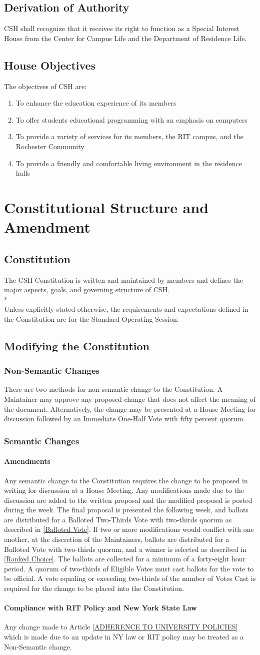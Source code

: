 \documentclass{article}
\newcommand{\article}[1]{\section{#1} \label{#1}}
\newcommand{\asection}[1]{\subsection{#1} \label{#1}}
\newcommand{\asubsection}[1]{\subsubsection{#1} \label{#1}}
\newcommand{\asubsubsection}[1]{\paragraph{#1} \label{#1}}
\begin{document}
\asection{Derivation of Authority}
CSH shall recognize that it receives its right to function as a Special Interest House from the Center for Campus Life and the Department of Residence Life.

\asection{House Objectives}
The objectives of CSH are:
\begin{enumerate}
	\item To enhance the education experience of its members
	\item To offer students educational programming with an emphasis on computers
	\item To provide a variety of services for its members, the RIT campus, and the Rochester Community
	\item To provide a friendly and comfortable living environment in the residence halls
\end{enumerate}

\article{Constitutional Structure and Amendment}

\asection{Constitution}
The CSH Constitution is written and maintained by members and defines the major aspects, goals, and governing structure of CSH.
\\*\\
Unless explicitly stated otherwise, the requirements and expectations defined in the Constitution are for the Standard Operating Session.

\asection{Modifying the Constitution}
\asubsection{Non-Semantic Changes}
There are two methods for non-semantic change to the Constitution.
A Maintainer may approve any proposed change that does not affect the meaning of the document.
Alternatively, the change may be presented at a House Meeting for discussion followed by an Immediate One-Half Vote with fifty percent quorum.

\asubsection{Semantic Changes}
\asubsubsection{Amendments}
Any semantic change to the Constitution requires the change to be proposed in writing for discussion at a House Meeting.
Any modifications made due to the discussion are added to the written proposal and the modified proposal is posted during the week.
The final proposal is presented the following week, and ballots are distributed for a Balloted Two-Thirds Vote with two-thirds quorum as described in \ref{Balloted Vote}.
If two or more modifications would conflict with one another, at the discretion of the Maintainers, ballots are distributed for a Balloted Vote with two-thirds quorum, and a winner is selected as described in \ref{Ranked Choice}.
The ballots are collected for a minimum of a forty-eight hour period.
A quorum of two-thirds of Eligible Votes must cast ballots for the vote to be official.
A vote equaling or exceeding two-thirds of the number of Votes Cast is required for the change to be placed into the Constitution.
\asubsubsection{Compliance with RIT Policy and New York State Law}
Any change made to Article  \ref{ADHERENCE TO UNIVERSITY POLICIES} which is made due to an update in NY law or RIT policy may be treated as a Non-Semantic change.
 
\end{document}
